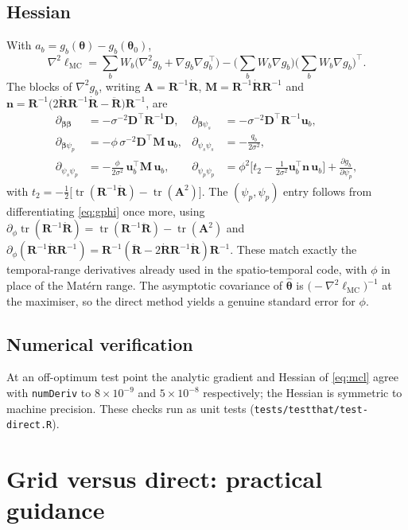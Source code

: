 \documentclass[11pt]{article}
\newcommand{\R}{\mathbf{R}}
\newcommand{\Rp}{\dot{\mathbf{R}}}
\newcommand{\Rpp}{\ddot{\mathbf{R}}}
\newcommand{\D}{\mathbf{D}}
\newcommand{\bet}{\bm{\beta}}
\newcommand{\tr}{\operatorname{tr}}
\begin{document}
\subsection{Hessian}
With $a_b=g_b(\bm\theta)-g_b(\bm\theta_0)$,
\begin{equation}
\nabla^2\ell_{\mathrm{MC}}
=\sum_b W_b\big(\nabla^2 g_b+\nabla g_b\nabla g_b^\top\big)
 -\Big(\sum_b W_b\nabla g_b\Big)\Big(\sum_b W_b\nabla g_b\Big)^\top .
\label{eq:hess}
\end{equation}
The blocks of $\nabla^2 g_b$, writing $\mathbf{A}=\R^{-1}\Rp$,
$\mathbf{M}=\R^{-1}\Rp\R^{-1}$ and
$\mathbf{n}=\R^{-1}\!\big(2\Rp\R^{-1}\Rp-\Rpp\big)\R^{-1}$, are
\begin{align*}
\partial_{\bet\bet} &= -\sigma^{-2}\D^\top\R^{-1}\D, &
\partial_{\bet\psi_s} &= -\sigma^{-2}\D^\top\R^{-1}\mathbf{u}_b, \\
\partial_{\bet\psi_p} &= -\phi\,\sigma^{-2}\D^\top\mathbf{M}\,\mathbf{u}_b, &
\partial_{\psi_s\psi_s} &= -\frac{q_b}{2\sigma^2}, \\
\partial_{\psi_s\psi_p} &= -\frac{\phi}{2\sigma^2}\,
   \mathbf{u}_b^\top\mathbf{M}\,\mathbf{u}_b, &
\partial_{\psi_p\psi_p} &= \phi^2\Big[t_2-\tfrac{1}{2\sigma^2}
   \mathbf{u}_b^\top\mathbf{n}\,\mathbf{u}_b\Big]
   +\frac{\partial g_b}{\partial\psi_p},
\end{align*}
with $t_2=-\tfrac12\big[\tr(\R^{-1}\Rpp)-\tr(\mathbf{A}^2)\big]$. The
$(\psi_p,\psi_p)$ entry follows from differentiating \eqref{eq:gphi} once more,
using $\partial_\phi\tr(\R^{-1}\Rp)=\tr(\R^{-1}\Rpp)-\tr(\mathbf{A}^2)$ and
$\partial_\phi(\R^{-1}\Rp\R^{-1})=\R^{-1}(\Rpp-2\Rp\R^{-1}\Rp)\R^{-1}$. These match
exactly the temporal-range derivatives already used in the spatio-temporal code,
with $\phi$ in place of the Mat\'ern range. The asymptotic
covariance of $\widehat{\bm\theta}$ is $\big(-\nabla^2\ell_{\mathrm{MC}}\big)^{-1}$
at the maximiser, so the direct method yields a genuine standard error for $\phi$.

\subsection{Numerical verification}
At an off-optimum test point the analytic gradient and Hessian of
\eqref{eq:mcl} agree with \texttt{numDeriv} to
$8\times10^{-9}$ and $5\times10^{-8}$ respectively; the Hessian is symmetric to
machine precision. These checks run as unit tests
(\texttt{tests/testthat/test-direct.R}).

\section{Grid versus direct: practical guidance}
\end{document}

